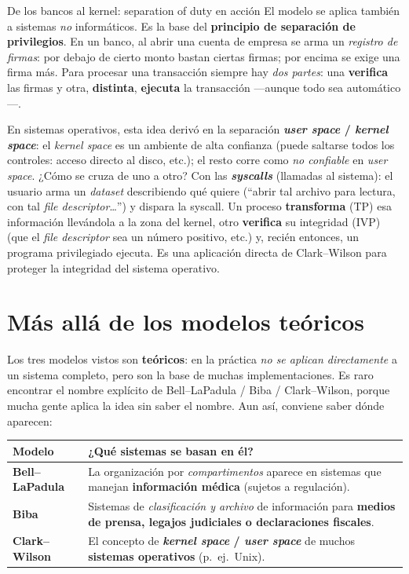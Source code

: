 \documentclass[11pt,a4paper]{article}
\begin{document}
\begin{anecbox}{De los bancos al kernel: separation of duty en acción}
El modelo se aplica también a sistemas \emph{no} informáticos. Es la base del
\textbf{principio de separación de privilegios}. En un banco, al abrir una cuenta de empresa
se arma un \emph{registro de firmas}: por debajo de cierto monto bastan ciertas firmas; por
encima se exige una firma más. Para procesar una transacción siempre hay \emph{dos partes}: una
\textbf{verifica} las firmas y otra, \textbf{distinta}, \textbf{ejecuta} la transacción
—aunque todo sea automático—.\medskip

\noindent En sistemas operativos, esta idea derivó en la separación
\textbf{\emph{user space} / \emph{kernel space}}: el \emph{kernel space} es un ambiente de alta
confianza (puede saltarse todos los controles: acceso directo al disco, etc.); el resto corre
como \emph{no confiable} en \emph{user space}. ¿Cómo se cruza de uno a otro? Con las
\textbf{\emph{syscalls}} (llamadas al sistema): el usuario arma un \emph{dataset} describiendo
qué quiere (``abrir tal archivo para lectura, con tal \emph{file descriptor}\dots'') y dispara
la syscall. Un proceso \textbf{transforma} (TP) esa información llevándola a la zona del
kernel, otro \textbf{verifica} su integridad (IVP) (que el \emph{file descriptor} sea un
número positivo, etc.) y, recién entonces, un programa privilegiado ejecuta. Es una aplicación
directa de Clark--Wilson para proteger la integridad del sistema operativo.
\end{anecbox}

\section{Más allá de los modelos teóricos}

Los tres modelos vistos son \textbf{teóricos}: en la práctica \emph{no se aplican
directamente} a un sistema completo, pero son la base de muchas implementaciones. Es raro
encontrar el nombre explícito de Bell--LaPadula / Biba / Clark--Wilson, porque mucha gente
aplica la idea sin saber el nombre. Aun así, conviene saber dónde aparecen:

\begin{center}
\renewcommand{\arraystretch}{1.35}
\begin{tabular}{>{\bfseries}p{3.4cm} p{9.6cm}}
\toprule
Modelo & ¿Qué sistemas se basan en él? \\
\midrule
Bell--LaPadula & La organización por \emph{compartimentos} aparece en sistemas que manejan
\textbf{información médica} (sujetos a regulación).\\
Biba & Sistemas de \emph{clasificación y archivo} de información para \textbf{medios de prensa,
legajos judiciales o declaraciones fiscales}.\\
Clark--Wilson & El concepto de \textbf{\emph{kernel space} / \emph{user space}} de muchos
\textbf{sistemas operativos} (p.\ ej.\ Unix).\\
\bottomrule
\end{tabular}
\end{center}
\end{document}
